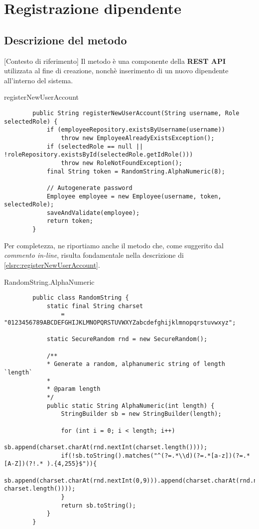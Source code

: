\section{Registrazione dipendente}
\subsection{Descrizione del metodo}[Contesto di riferimento]
Il metodo  è una componente della \textbf{REST API} utilizzata
al fine di creazione, nonchè inserimento di un nuovo dipendente all'interno del sistema.

\begin{elsrc}{registerNewUserAccount}
	\begin{verbatim}
		public String registerNewUserAccount(String username, Role selectedRole) {
			if (employeeRepository.existsByUsername(username))
				throw new EmployeeAlreadyExistsException();
			if (selectedRole == null || !roleRepository.existsById(selectedRole.getIdRole()))
				throw new RoleNotFoundException();
			final String token = RandomString.AlphaNumeric(8);

			// Autogenerate password
			Employee employee = new Employee(username, token, selectedRole);
			saveAndValidate(employee);
			return token;
		}
	\end{verbatim}
\end{elsrc}

Per completezza, ne riportiamo anche il metodo  che,
come suggerito dal \textit{commento in-line}, risulta fondamentale nella descrizione 
di \autoref{elsrc:registerNewUserAccount}.

\begin{elsrc}{RandomString.AlphaNumeric}
	\begin{verbatim}
		public class RandomString {
			static final String charset 
				= "0123456789ABCDEFGHIJKLMNOPQRSTUVWXYZabcdefghijklmnopqrstuvwxyz";

			static SecureRandom rnd = new SecureRandom();

			/**
			* Generate a random, alphanumeric string of length `length`
			*
			* @param length 
			*/
			public static String AlphaNumeric(int length) {
				StringBuilder sb = new StringBuilder(length);

				for (int i = 0; i < length; i++)
					sb.append(charset.charAt(rnd.nextInt(charset.length())));
				if(!sb.toString().matches("^(?=.*\\d)(?=.*[a-z])(?=.*[A-Z])(?!.* ).{4,255}$")){
					sb.append(charset.charAt(rnd.nextInt(0,9))).append(charset.charAt(rnd.nextInt(10,35))).append(charset.charAt(rnd.nextInt(36, charset.length())));
				}
				return sb.toString();
			}
		}
	\end{verbatim}
\end{elsrc}


